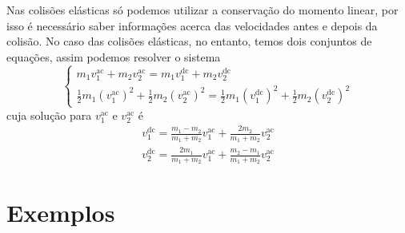 Nas colisões elásticas só podemos utilizar a conservação do momento linear, por isso é necessário saber informações acerca das velocidades antes e depois da colisão. No caso das colisões elásticas, no entanto, temos dois conjuntos de equações, assim podemos resolver o sistema
\begin{equation}
\begin{cases}
m_1 v_1^{\textrm{ac}} + m_2 v_2^{\textrm{ac}} = m_1 v_1^{\textrm{dc}} + m_2 v_2^{\textrm{dc}} \\
\frac{1}{2}m_1 (v_1^{\textrm{ac}})^2 + \frac{1}{2}m_2 (v_2^{\textrm{ac}})^2 = \frac{1}{2}m_1 (v_1^{\textrm{dc}})^2 + \frac{1}{2}m_2 (v_2^{\textrm{dc}})^2
\end{cases}
\end{equation}
%
cuja solução para $v_1^{\textrm{ac}}$ e $v_2^{\textrm{ac}}$ é
\begin{align}
v_1^{\textrm{dc}} = \frac{m_1 - m_2}{m_1+m_2} v_1^{\textrm{ac}} + \frac{2m_2}{m_1+m_2} v_2^{\textrm{ac}} \\
v_2^{\textrm{dc}} = \frac{2m_1}{m_1+m_2} v_1^{\textrm{ac}} + \frac{m_2 - m_1}{m_1+m_2} v_2^{\textrm{ac}}
\end{align}

\section{Exemplos}
